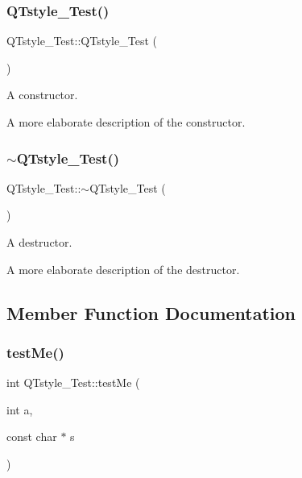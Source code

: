 \subsubsection{\texorpdfstring{Q\+Tstyle\+\_\+\+Test()}{QTstyle\_Test()}}
{\footnotesize\ttfamily Q\+Tstyle\+\_\+\+Test\+::\+Q\+Tstyle\+\_\+\+Test (\begin{DoxyParamCaption}{ }\end{DoxyParamCaption})}



A constructor. 

A more elaborate description of the constructor. \mbox{\label{classQTstyle__Test_a7e82397d534d9a867f0857da01a46e9e}} 
\subsubsection{\texorpdfstring{$\sim$\+Q\+Tstyle\+\_\+\+Test()}{~QTstyle\_Test()}}
{\footnotesize\ttfamily Q\+Tstyle\+\_\+\+Test\+::$\sim$\+Q\+Tstyle\+\_\+\+Test (\begin{DoxyParamCaption}{ }\end{DoxyParamCaption})}



A destructor. 

A more elaborate description of the destructor. 

\subsection{Member Function Documentation}
\mbox{\label{classQTstyle__Test_a8840748753118dd468e8368a28e49c62}} 
\subsubsection{\texorpdfstring{test\+Me()}{testMe()}}
{\footnotesize\ttfamily int Q\+Tstyle\+\_\+\+Test\+::test\+Me (\begin{DoxyParamCaption}\item[{int}]{a,  }\item[{const char $\ast$}]{s }\end{DoxyParamCaption})}



